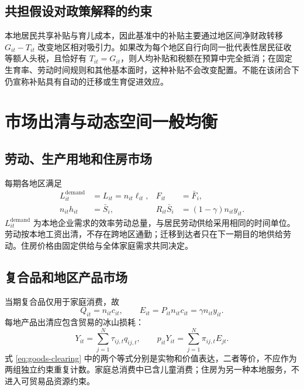 \documentclass[UTF8,a4paper,zihao=-4,fontset=windows]{ctexart}
\numberwithin{equation}{section}
\begin{document}
\subsection{共担假设对政策解释的约束}
本地居民共享补贴与育儿成本，因此基准中的补贴主要通过地区间净财政转移 $G_{it}-T_{it}$ 改变地区相对吸引力。如果改为每个地区自行向同一批代表性居民征收等额人头税，且恰好有 $T_{it}=G_{it}$，则人均补贴和税额在预算中完全抵消；在固定生育率、劳动时间规则和其他基本面时，这种补贴不会改变配置。不能在该闭合下仍宣称补贴具有自动的迁移或生育促进效应。

\section{市场出清与动态空间一般均衡}
\label{sec:equilibrium}

\subsection{劳动、生产用地和住房市场}
每期各地区满足
\begin{align}
  L^{\mathrm{demand}}_{it}&=L_{it}=n_{it}\ell_{it},
    & F_{it}&=\bar F_i,\label{eq:factor-clearing}\\
  n_{it}h_{it}&=\bar S_i,
    & R_{it}\bar S_i&=(1-\gamma)n_{it}y_{it}.
    \label{eq:housing-clearing}
\end{align}
$L^{\mathrm{demand}}_{it}$ 为本地企业需求的效率劳动总量，与居民劳动供给采用相同的时间单位。劳动按本地工资出清，不存在跨地区通勤；迁移到达者只在下一期目的地供给劳动。住房价格由固定供给与全体家庭需求共同决定。

\subsection{复合品和地区产品市场}
当期复合品仅用于家庭消费，故
\begin{equation}
  Q_{it}=n_{it}c_{it},\qquad
  E_{it}=P_{it}n_{it}c_{it}=\gamma n_{it}y_{it}.
  \label{eq:composite-clearing}
\end{equation}
每地产品出清应包含贸易的冰山损耗：
\begin{equation}
  Y_{it}=\sum_{j=1}^N\tau_{ij,t}q_{ij,t},\qquad
  p_{it}Y_{it}=\sum_{j=1}^N\pi_{ij,t}E_{jt}.
  \label{eq:goods-clearing}
\end{equation}
式 \eqref{eq:goods-clearing} 中的两个等式分别是实物和价值表达，二者等价，不应作为两组独立约束重复计数。家庭总消费中已含儿童消费；住房为另一种本地服务，不进入可贸易品资源约束。
\end{document}
